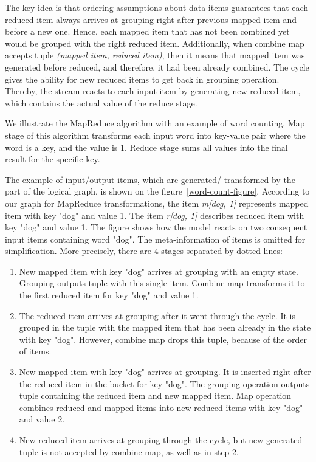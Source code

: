 The key idea is that ordering assumptions about data items guarantees that each reduced item always arrives at grouping right after previous mapped item and before a new one. Hence, each mapped item that has not been combined yet would be grouped with the right reduced item. Additionally, when combine map accepts tuple {\it (mapped item, reduced item)}, then it means that mapped item was generated before reduced, and therefore, it had been already combined. The cycle gives the ability for new reduced items to get back in grouping operation. Thereby, the stream reacts to each input item by generating new reduced item, which contains the actual value of the reduce stage.

We illustrate the MapReduce algorithm with an example of word counting. Map stage of this algorithm transforms each input word into key-value pair where the word is a key, and the value is 1. Reduce stage sums all values into the final result for the specific key. 

The example of input/output items, which are generated/ transformed by the part of the logical graph, is shown on the figure~\ref {word-count-figure}. According to our graph for MapReduce transformations, the item {\it m[dog, 1]} represents mapped item with key "dog" and value 1. The item {\it r[dog, 1]} describes reduced item with key "dog" and value 1. The figure shows how the model reacts on two consequent input items containing word "dog". The meta-information of items is omitted for simplification. More precisely, there are 4 stages separated by dotted lines:

\begin{enumerate}
    \item New mapped item with key "dog" arrives at grouping with an empty state. Grouping outputs tuple with this single item. Combine map transforms it to the first reduced item for key "dog" and value 1.
    \item The reduced item arrives at grouping after it went through the cycle. It is grouped in the tuple with the mapped item that has been already in the state with key "dog". However, combine map drops this tuple, because of the order of items.
    \item New mapped item with key "dog" arrives at grouping. It is inserted right after the reduced item in the bucket for key "dog". The grouping operation outputs tuple containing the reduced item and new mapped item. Map operation combines reduced and mapped items into new reduced items with key "dog" and value 2.
    \item New reduced item arrives at grouping through the cycle, but new generated tuple is not accepted by combine map, as well as in step 2.
\end{enumerate}

